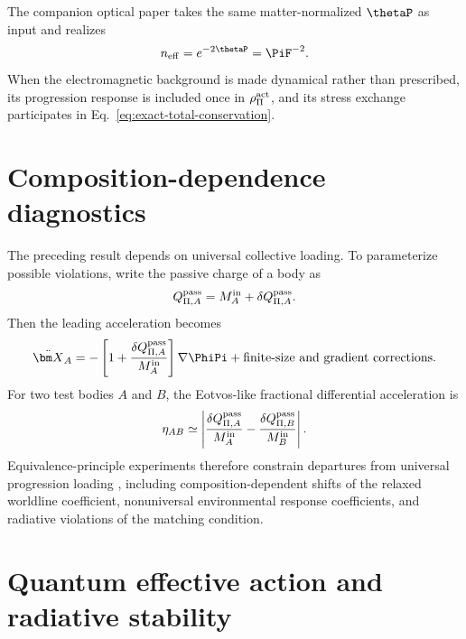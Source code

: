 \documentclass[12pt]{article}
\begin{document}
The companion optical paper takes the same matter-normalized \(\thetaP\) as input and realizes
\begin{equation}
    n_{\rm eff}=e^{-2\thetaP}=\PiF^{-2} .
    \label{eq:matter-optical-interface}
\end{equation}
When the electromagnetic background is made dynamical rather than prescribed, its progression response is included once in \(\rho_\Pi^{\rm act}\), and its stress exchange participates in Eq.~\eqref{eq:exact-total-conservation}.
\section{Composition-dependence diagnostics}

The preceding result depends on universal collective loading.  To parameterize possible violations, write the passive charge of a body as
\begin{equation}
    Q_{\Pi,A}^{\rm pass}=M_A^{\rm in}+\delta Q_{\Pi,A}^{\rm pass} .
    \label{eq:Qpi-nonuniv-normalized}
\end{equation}
Then the leading acceleration becomes
\begin{equation}
    \ddot{\bm X}_A
    =-\left[1+\frac{\delta Q_{\Pi,A}^{\rm pass}}{M_A^{\rm in}}\right]\nabla\PhiPi
    +\text{finite-size and gradient corrections}.
    \label{eq:nonuniv-accel-normalized}
\end{equation}
For two test bodies \(A\) and \(B\), the Eotvos-like fractional differential acceleration is
\begin{equation}
    \eta_{AB}\simeq
    \left|
    \frac{\delta Q_{\Pi,A}^{\rm pass}}{M_A^{\rm in}}
    -
    \frac{\delta Q_{\Pi,B}^{\rm pass}}{M_B^{\rm in}}
    \right| .
    \label{eq:eotvos-normalized}
\end{equation}
Equivalence-principle experiments therefore constrain departures from universal progression loading \cite{Will2014,Schiff1960}, including composition-dependent shifts of the relaxed worldline coefficient, nonuniversal environmental response coefficients, and radiative violations of the matching condition.
\section{Quantum effective action and radiative stability}
\end{document}
